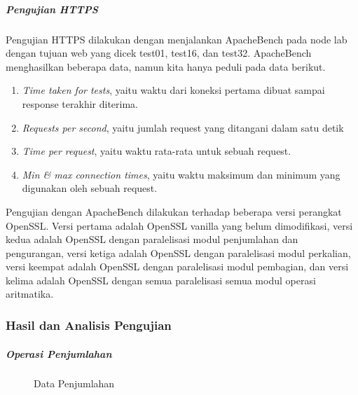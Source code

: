       \subparagraph{Pengujian HTTPS}
      Pengujian HTTPS dilakukan dengan menjalankan ApacheBench pada node lab dengan tujuan web yang dicek test01, test16, dan test32. ApacheBench menghasilkan beberapa data, namun kita hanya peduli pada data berikut.
      \begin{enumerate}[label=\roman*.]
        \item \textit{Time taken for tests}, yaitu waktu dari koneksi pertama dibuat sampai response terakhir diterima.
        \item \textit{Requests per second}, yaitu jumlah request yang ditangani dalam satu detik
        \item \textit{Time per request}, yaitu waktu rata-rata untuk sebuah request.
        \item \textit{Min \& max connection times}, yaitu waktu maksimum dan minimum yang digunakan oleh sebuah request.
      \end{enumerate}

      Pengujian dengan ApacheBench dilakukan terhadap beberapa versi perangkat OpenSSL. Versi pertama adalah OpenSSL vanilla yang belum dimodifikasi, versi kedua adalah OpenSSL dengan paralelisasi modul penjumlahan dan pengurangan, versi ketiga adalah OpenSSL dengan paralelisasi modul perkalian, versi keempat adalah OpenSSL dengan paralelisasi modul pembagian, dan versi kelima adalah OpenSSL dengan semua paralelisasi semua modul operasi aritmatika.

    \subsubsection{Hasil dan Analisis Pengujian}

      \subparagraph{Operasi Penjumlahan}
      \begin{figure}[h]
        \centering
        \caption{Data Penjumlahan}
        \label{fig:data_add}
      \end{figure}

